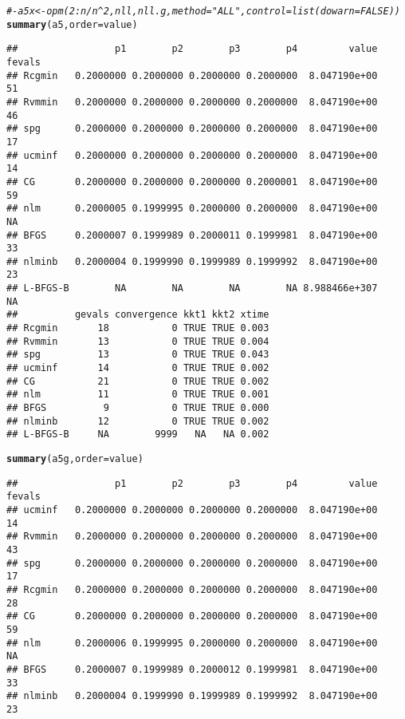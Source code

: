 \documentclass[11pt]{article}\usepackage[]{graphicx}\usepackage[]{color}
\makeatletter
\newcommand{\hlcom}[1]{\textcolor[rgb]{0.678,0.584,0.686}{\textit{#1}}}%
\newcommand{\hlstd}[1]{\textcolor[rgb]{0.345,0.345,0.345}{#1}}%
\newcommand{\hlkwc}[1]{\textcolor[rgb]{0.333,0.667,0.333}{#1}}%
\newcommand{\hlkwd}[1]{\textcolor[rgb]{0.737,0.353,0.396}{\textbf{#1}}}%
\newenvironment{kframe}{%
 \def\at@end@of@kframe{}%
 \ifinner\ifhmode%
  \def\at@end@of@kframe{\end{minipage}}%
  \begin{minipage}{\columnwidth}%
 \fi\fi%
 \def\FrameCommand##1{\hskip\@totalleftmargin \hskip-\fboxsep
 \colorbox{shadecolor}{##1}\hskip-\fboxsep
     \hskip-\linewidth \hskip-\@totalleftmargin \hskip\columnwidth}%
 \MakeFramed {\advance\hsize-\width
   \@totalleftmargin\z@ \linewidth\hsize
   \@setminipage}}%
 {\par\unskip\endMakeFramed%
 \at@end@of@kframe}
\newenvironment{knitrout}{}{} %
\makeatother
\begin{document}
\begin{knitrout}
\begin{kframe}
{\ttfamily\noindent\color{warningcolor}{\#\# Warning in optimr(par, fn, gr, method = meth, lower = lower, upper = upper, : optimr: optim() with bounds ONLY uses L-BFGS-B}}\begin{alltt}
\hlcom{#- a5x <- opm(2:n/n^2, nll, nll.g, method="ALL", control=list(dowarn=FALSE))}
\hlkwd{summary}\hlstd{(a5,}\hlkwc{order}\hlstd{=value)}
\end{alltt}
\begin{verbatim}
##                 p1        p2        p3        p4         value fevals
## Rcgmin   0.2000000 0.2000000 0.2000000 0.2000000  8.047190e+00     51
## Rvmmin   0.2000000 0.2000000 0.2000000 0.2000000  8.047190e+00     46
## spg      0.2000000 0.2000000 0.2000000 0.2000000  8.047190e+00     17
## ucminf   0.2000000 0.2000000 0.2000000 0.2000000  8.047190e+00     14
## CG       0.2000000 0.2000000 0.2000000 0.2000001  8.047190e+00     59
## nlm      0.2000005 0.1999995 0.2000000 0.2000000  8.047190e+00     NA
## BFGS     0.2000007 0.1999989 0.2000011 0.1999981  8.047190e+00     33
## nlminb   0.2000004 0.1999990 0.1999989 0.1999992  8.047190e+00     23
## L-BFGS-B        NA        NA        NA        NA 8.988466e+307     NA
##          gevals convergence kkt1 kkt2 xtime
## Rcgmin       18           0 TRUE TRUE 0.003
## Rvmmin       13           0 TRUE TRUE 0.004
## spg          13           0 TRUE TRUE 0.043
## ucminf       14           0 TRUE TRUE 0.002
## CG           21           0 TRUE TRUE 0.002
## nlm          11           0 TRUE TRUE 0.001
## BFGS          9           0 TRUE TRUE 0.000
## nlminb       12           0 TRUE TRUE 0.002
## L-BFGS-B     NA        9999   NA   NA 0.002
\end{verbatim}
\begin{alltt}
\hlkwd{summary}\hlstd{(a5g,}\hlkwc{order}\hlstd{=value)}
\end{alltt}
\begin{verbatim}
##                 p1        p2        p3        p4         value fevals
## ucminf   0.2000000 0.2000000 0.2000000 0.2000000  8.047190e+00     14
## Rvmmin   0.2000000 0.2000000 0.2000000 0.2000000  8.047190e+00     43
## spg      0.2000000 0.2000000 0.2000000 0.2000000  8.047190e+00     17
## Rcgmin   0.2000000 0.2000000 0.2000000 0.2000000  8.047190e+00     28
## CG       0.2000000 0.2000000 0.2000000 0.2000000  8.047190e+00     59
## nlm      0.2000006 0.1999995 0.2000000 0.2000000  8.047190e+00     NA
## BFGS     0.2000007 0.1999989 0.2000012 0.1999981  8.047190e+00     33
## nlminb   0.2000004 0.1999990 0.1999989 0.1999992  8.047190e+00     23

\end{verbatim}
\end{kframe}
\end{knitrout}
\end{document}
